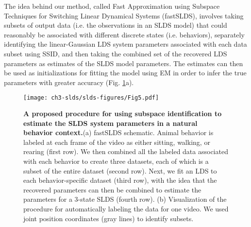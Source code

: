 The idea behind our method, called Fast Approximation using Subspace Techniques for Switching Linear Dynamical Systems (fastSLDS), involves taking subsets of output data (i.e. the observations in an SLDS model) that could reasonably be associated with different discrete states (i.e. behaviors), separately identifying the linear-Gaussian LDS system parameters associated with each data subset using SSID, and then taking the combined set of the recovered LDS parameters as estimates of the SLDS model parameters. The estimates can then be used as initializations for fitting the model using EM in order to infer the true parameters with greater accuracy (Fig. \ref{fig:slds:5}a).    
\begin{figure}[t!]
  \begin{center}
    \texttt{[image: ch3-slds/slds-figures/Fig5.pdf]}
    \caption[A proposed procedure for using subspace identification to estimate the SLDS system parameters in a natural behavior context]{\textbf{A proposed procedure for using subspace identification to estimate the SLDS system parameters in a natural behavior context.}(a) fastSLDS schematic. Animal behavior is labeled at each frame of the video as either sitting, walking, or rearing (first row). We then combined all the labeled data associated with each behavior to create three datasets, each of which is a subset of the entire dataset (second row). Next, we fit an LDS to each behavior-specific dataset (third row), with the idea that the recovered parameters can then be combined to estimate the parameters for a 3-state SLDS (fourth row). (b) Visualization of the procedure for automatically labeling the data for one video. We used joint position coordinates (gray lines) to identify subsets.}
    \label{fig:slds:5}
  \end{center}
  \vspace{-1.0cm}
\end{figure}

\begin{figure}[t!]
\end{figure}



